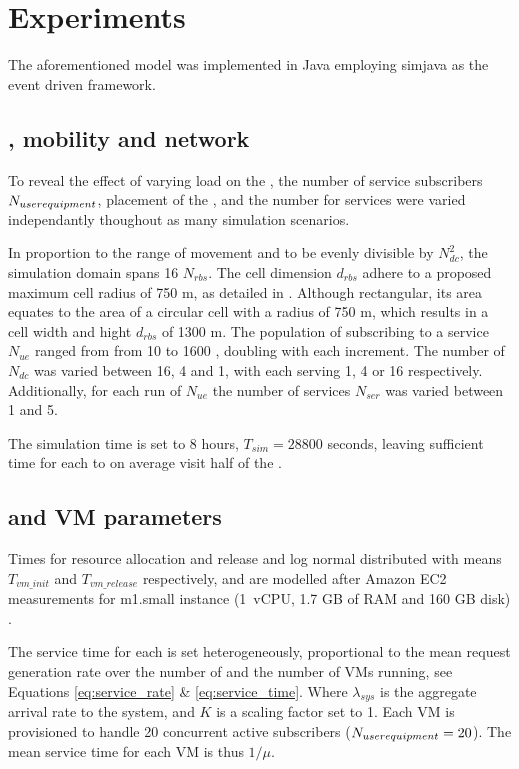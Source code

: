 \section{Experiments}
\label{sec:experiments}
The aforementioned model was implemented in Java employing simjava \cite{SimJava} as the event driven framework.

\subsection{\Ue, mobility and network}
To reveal the effect of varying load on the \dcs{}, the number of \ue{} service subscribers $N_{user equipment}$, placement of the \dcs{}, and the number for services were varied independantly thoughout as many simulation scenarios. 

In proportion to the range of movement and to be evenly divisible by $N_{dc}^2$, the simulation domain spans 16 \rbss{} $N_{rbs}$. The cell dimension $d_{rbs}$ adhere to a proposed maximum cell radius of 750 m, as detailed in \cite{shahab2013framework}. Although rectangular, its area equates to the area of a circular cell with a radius of 750 m, which results in a cell width and hight $d_{rbs}$ of 1300 m. The population of \ues{} subscribing to a service $N_{ue}$ ranged from from 10 to 1600 \ues{}, doubling with each increment. The number of \dcs{} $N_{dc}$ was varied between 16, 4 and 1, with each \dc{} serving 1, 4 or 16 \rbss{} respectively. Additionally, for each run of $N_{ue}$ the number of services $N_{ser}$ was varied between 1 and 5.

The simulation time is set to 8 hours, $T_{sim}=28800$ seconds, leaving sufficient time for each \ue{} to on average visit half of the \rbss{}.

\subsection{\Dc{} and VM parameters}
Times for resource allocation and release and log normal distributed with means $T_{vm\_init}$ and $T_{vm\_release}$ respectively, and are modelled after Amazon EC2 measurements for m1.small instance (1~vCPU, 1.7 GB of RAM and 160 GB disk) \cite{5719609}. %

The service time for each \dc{} is set heterogeneously, proportional to the mean request generation rate over the number of \rbss{} and the number of VMs running, see Equations \ref{eq:service_rate} \& \ref{eq:service_time}. Where $\lambda_{sys}$ is the aggregate arrival rate to the system, and $K$ is a scaling factor set to 1. Each VM is provisioned to handle 20 concurrent active subscribers ($N_{user equipment} = 20$). The mean service time for each VM is thus $1/\mu$.

